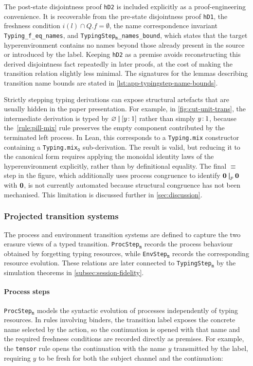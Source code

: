 The post-state disjointness proof \texttt{hD2} is included explicitly as a proof-engineering convenience. It is recoverable from the pre-state disjointness proof \texttt{hD1}, the freshness condition $i(l) \cap Q.f = \emptyset$, the name correspondence invariant \texttt{Typing\_f\_eq\_names}, and \texttt{TypingStep}$_\texttt{m}$\texttt{\_names\_bound}, which states that the target hyperenvironment contains no names beyond those already present in the source or introduced by the label. Keeping \texttt{hD2} as a premise avoids reconstructing this derived disjointness fact repeatedly in later proofs, at the cost of making the transition relation slightly less minimal. The signatures for the lemmas describing transition name bounds are stated in \cref{lst:app-typingstep-name-bounds}.

Strictly stepping typing derivations can expose structural artefacts that are usually hidden in the paper presentation. For example, in \cref{fig:cut-unit-trans}, the intermediate derivation is typed by $\varnothing \mathbin{\boldsymbol{|}} [y\colon\mspace{-2mu}1]$ rather than simply $y\colon\mspace{-2mu}1$, because the~\ref{rule:pill-mix} rule preserves the empty component contributed by the terminated left process. In Lean, this corresponds to a \texttt{Typing.mix} constructor containing a \texttt{Typing.mix}$_\texttt{0}$ sub-derivation. The result is valid, but reducing it to the canonical form requires applying the monoidal identity laws of the hyperenvironment explicitly, rather than by definitional equality. The final $\equiv$ step in the figure, which additionally uses process congruence to identify $\mathbf{0} \mathbin{\boldsymbol{|}}_p \mathbf{0}$ with $\mathbf{0}$, is not currently automated because structural congruence has not been mechanised. This limitation is discussed further in \cref{sec:discussion}.

\subsubsection{Projected transition systems}\label{subsubsec:inducedlts}
The process and environment transition systems are defined to capture the two erasure views of a typed transition. \texttt{ProcStep}$_\texttt{m}$ records the process behaviour obtained by forgetting typing resources, while \texttt{EnvStep}$_\texttt{m}$ records the corresponding resource evolution. These relations are later connected to \texttt{TypingStep}$_\texttt{m}$ by the simulation theorems in \cref{subsec:session-fidelity}.

\paragraph{Process steps}
\texttt{ProcStep}$_{\texttt{m}}$ models the syntactic evolution of processes independently of typing resources. In rules involving binders, the transition label exposes the concrete name selected by the action, so the continuation is opened with that name and the required freshness conditions are recorded directly as premises. For example, the \texttt{tensor} rule opens the continuation with the name $y$ transmitted by the label, requiring $y$ to be fresh for both the subject channel and the continuation:

